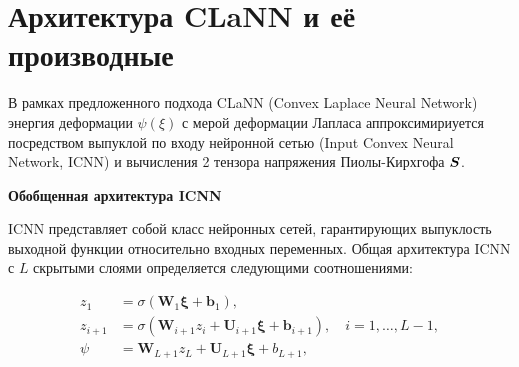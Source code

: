 


\section{Архитектура CLaNN и её производные}


В рамках предложенного подхода CLaNN (Convex Laplace Neural Network) энергия деформации \(\psi(\xi)\)
с мерой деформации Лапласа аппроксимириуется посредством выпуклой по входу нейронной сетью (Input Convex Neural Network, ICNN) 
и вычисления 2 тензора напряжения Пиолы-Кирхгофа \(\boldsymbol{S}\). 

\textbf{Обобщенная архитектура ICNN}

ICNN представляет собой класс нейронных сетей, гарантирующих выпуклость выходной функции относительно входных переменных. 
Общая архитектура ICNN с $L$ скрытыми слоями определяется следующими соотношениями:

\begin{align}
z_1 &= \sigma(\mathbf{W}_1 \boldsymbol{\xi} + \mathbf{b}_1), \\
z_{i+1} &= \sigma(\mathbf{W}_{i+1} z_i + \mathbf{U}_{i+1} \boldsymbol{\xi} + \mathbf{b}_{i+1}), \quad i = 1, \ldots, L-1, \\
\psi &= \mathbf{W}_{L+1} z_L + \mathbf{U}_{L+1} \boldsymbol{\xi} + b_{L+1},
\end{align}


